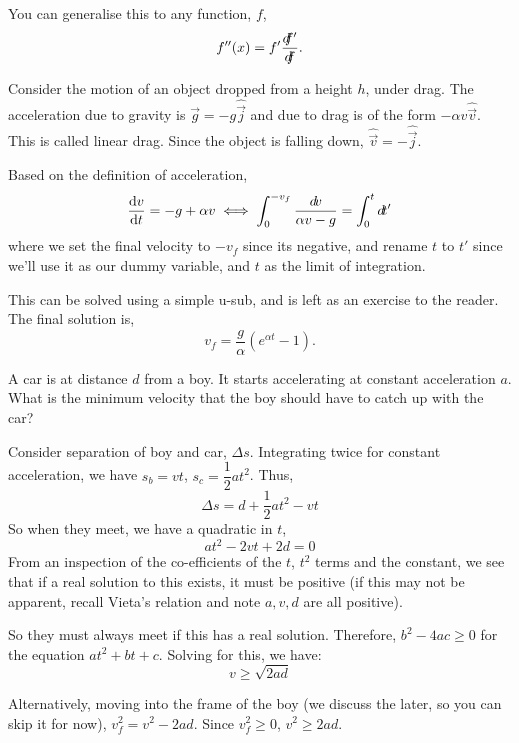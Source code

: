You can generalise this to any function, $f$,
\begin{equation}
f''(x) = f'\frac{d\hspace{-0.35em}f'}{d\hspace{-0.35em}f}.
\end{equation}

\begin{example}
    Consider the motion of an object dropped from a height $h$, under 
    drag. The acceleration due to gravity is $\vec{g} = -g \hat{\vec{j}}$ and due to drag is of the form $-\alpha v \hat{\vec{v}}$. This is 
    called linear drag. Since the object is falling down, $\hat{\vec{v}} = -\hat{\vec{j}}$.

    Based on the definition of acceleration, 
    $$
    \dv{v}{t} = - g + \alpha v \iff \int_0^{-v_f} \frac{\mathop{}\!{d}\!{v}}{\alpha v - g} = \int_0^{t} \mathop{}\!{d}\!{t'}
    $$
    where we set the final velocity to $-v_f$ since its negative, and rename $t$ to $t'$ since we'll use it as our dummy variable, and $t$ as the limit of integration.

    This can be solved using a simple u-sub, and is left as an exercise
    to the reader. The final solution is,
    $$v_f = \frac{g}{\alpha} (e^{\alpha t} - 1).$$
\end{example}

\begin{example}
    A car is at distance $d$ from a boy. It starts accelerating at constant acceleration $a$.  
    What is the minimum velocity that the boy should have to catch up with the car?

\begin{soln}
    Consider separation of boy and car, $\Delta s$. Integrating twice for constant acceleration, we have  
    $s_b = vt$, $s_c = \dfrac{1}{2}at^2$. Thus,
    \[
    \Delta s = d + \frac{1}{2}at^2 - vt
    \]
    So when they meet, we have a quadratic in $t$,
    \[
    at^2 - 2vt + 2d = 0
    \]
    From an inspection of the co-efficients of the $t$, $t^2$ terms and the constant, we see that if a real solution to this exists, 
    it must be positive (if this may not be apparent, recall Vieta's relation and note $a, v, d$ are all positive).

    So they must always meet if this has a real solution. Therefore, $b^2 - 4ac \geq 0$ for the equation
    $at^2 + bt + c$. Solving for this, we have:
    \[
    v \geq \sqrt{2ad}
    \]

    Alternatively, moving into the frame of the boy (we discuss the later, so you can skip it for now), 
    $v_f^2 = v^2 - 2ad$. Since $v_f^2 \ge 0$, $v^2 \ge 2ad$.
\end{soln}
\end{example}

